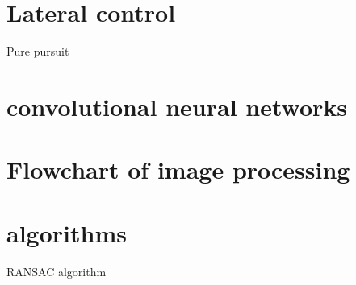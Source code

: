 \section{Lateral control}
Pure pursuit
\section{convolutional neural networks}


\section{Flowchart of image processing}
\section{algorithms}
RANSAC algorithm 